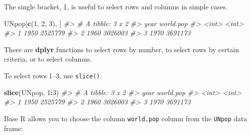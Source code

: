 \documentclass[]{book}
\newenvironment{Shaded}{\begin{snugshade}}{\end{snugshade}}
\newcommand{\KeywordTok}[1]{\textcolor[rgb]{0.13,0.29,0.53}{\textbf{#1}}}
\newcommand{\DecValTok}[1]{\textcolor[rgb]{0.00,0.00,0.81}{#1}}
\newcommand{\StringTok}[1]{\textcolor[rgb]{0.31,0.60,0.02}{#1}}
\newcommand{\CommentTok}[1]{\textcolor[rgb]{0.56,0.35,0.01}{\textit{#1}}}
\newcommand{\OperatorTok}[1]{\textcolor[rgb]{0.81,0.36,0.00}{\textbf{#1}}}
\newcommand{\NormalTok}[1]{#1}
\theoremstyle{definition}
\theoremstyle{definition}
\theoremstyle{definition}
\theoremstyle{remark}
\begin{document}
The single bracket, \texttt{{[}}, is useful to select rows and columns
in simple cases.

\begin{Shaded}
\begin{Highlighting}[]
\NormalTok{UNpop[}\KeywordTok{c}\NormalTok{(}\DecValTok{1}\NormalTok{, }\DecValTok{2}\NormalTok{, }\DecValTok{3}\NormalTok{), ]}
\CommentTok{#> # A tibble: 3 x 2}
\CommentTok{#>    year world.pop}
\CommentTok{#>   <int>     <int>}
\CommentTok{#> 1  1950   2525779}
\CommentTok{#> 2  1960   3026003}
\CommentTok{#> 3  1970   3691173}
\end{Highlighting}
\end{Shaded}

There are \textbf{dplyr} functions to select rows by number, to select
rows by certain criteria, or to select columns.

To select rows 1--3, use \texttt{slice()}.

\begin{Shaded}
\begin{Highlighting}[]
\KeywordTok{slice}\NormalTok{(UNpop, }\DecValTok{1}\OperatorTok{:}\DecValTok{3}\NormalTok{)}
\CommentTok{#> # A tibble: 3 x 2}
\CommentTok{#>    year world.pop}
\CommentTok{#>   <int>     <int>}
\CommentTok{#> 1  1950   2525779}
\CommentTok{#> 2  1960   3026003}
\CommentTok{#> 3  1970   3691173}
\end{Highlighting}
\end{Shaded}

Base R allows you to choose the column \texttt{world.pop} column from
the \texttt{UNpop} data frame:

\begin{Shaded}
\end{Shaded}
\end{document}
